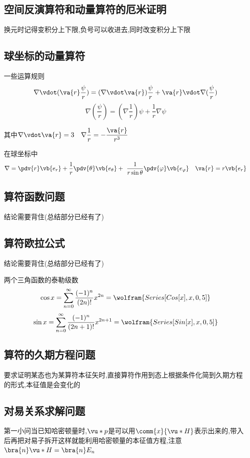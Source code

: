         \subsection{空间反演算符和动量算符的厄米证明}
            换元时记得变积分上下限,负号可以收进去,同时改变积分上下限
        \subsection{球坐标的动量算符}
            一些运算规则
            $$ \nabla \vdot (\va{r} \frac{\psi}{r})  =  (\nabla \vdot \va{r}) \frac{\psi}{r} + \va{r} \vdot \nabla(\frac{\psi}{r}) $$
            $$ \nabla (\frac{\psi}{r}) = (\nabla \frac{1}{r})\psi + \frac{1}{r} \nabla \psi $$
            
            其中$ \nabla \vdot \va{r} = 3 \quad \nabla \dfrac{1}{r} = - \dfrac{\va{r}}{r^{3}} $

            在球坐标中
            $$ \nabla =  \pdv{r} \vb{e_{r}} +  \frac{1}{r} \pdv{\theta} \vb{e_{\theta}} + \ \frac{1}{r \sin{\theta}} \pdv{\varphi} \vb{e_{\varphi}} \quad \va{r} = r \vb{e_{r}}  $$         
    
        \subsection{算符函数问题}
            结论需要背住(总结部分已经有了)
        \subsection{算符欧拉公式}
            结论需要背住(总结部分已经有了)
            \begin{formal}
                两个三角函数的泰勒级数
                $$ \cos{x} = \sum_{n=0}^{\infty} \frac{(-1)^{n}}{(2n)!} x^{2n} = \wolfram{Series[Cos[x],{x,0,5}]} $$
                $$ \sin{x} = \sum_{n=0}^{\infty} \frac{(-1)^{n}}{(2n+1)!} x^{2n+1} = \wolfram{Series[Sin[x],{x,0,5}]} $$
            \end{formal}
            
        
        \subsection{算符的久期方程问题}
            要求证明某态也为某算符本征矢时,直接算符作用到态上根据条件化简到久期方程的形式,本征值是会变化的
        \subsection{对易关系求解问题}
            第一小问当已知哈密顿量时,$\vu*{p}$是可以用$\comm{x}{\vu*{H}}$表示出来的,带入后再把对易子拆开这样就能利用哈密顿量的本征值方程,注意$ \bra{n} \vu*{H} = \bra{n} E_{n} $

